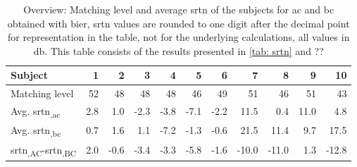 \begin{table}[H]
\centering
\caption{Overview: Matching level and average \gls{srtn} of the subjects for \gls{ac} and \gls{bc} obtained with \gls{bier}, \gls{srtn} values are rounded to one digit after the decimal point for representation in the table, not for the underlying calculations, all values in \si{\decibel}. This table consists of the results presented in \autoref{tab: srtn} and ??}
\label{tab:combined_data}
\begin{tabular}{l|rrrrrrrrrr}
Subject     & 1   & 2    & 3    & 4    & 5    & 6    & 7     & 8     & 9    & 10   \\ \hline
Matching level & 52 & 48  & 48 & 48 & 46 & 49 & 51  & 46   & 51 & 43  \\
Avg. \gls{srtn}\textsubscript{,\gls{ac}} & 2.8 & 1.0  & -2.3 & -3.8 & -7.1 & -2.2 & 11.5  & 0.4   & 11.0 & 4.8  \\
Avg. \gls{srtn}\textsubscript{,\gls{bc}} & 0.7 & 1.6  & 1.1  & -7.2 & -1.3 & -0.6 & 21.5  & 11.4  & 9.7  & 17.5 \\
\gls{srtn}\textsubscript{,AC}-\gls{srtn}\textsubscript{,BC}  & 2.0 & -0.6 & -3.4 & -3.3 & -5.8 & -1.6 & -10.0 & -11.0 & 1.3  & -12.8
\end{tabular}
\end{table}

